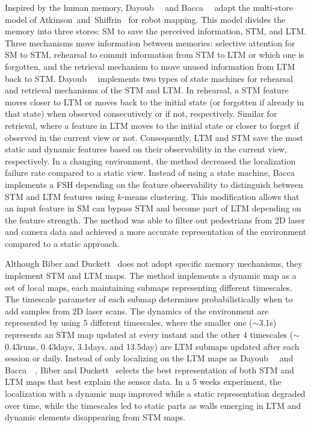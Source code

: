 Inspired by the human memory, Dayoub~\etal~\cite{dayoub-et-al:2011:013} and Bacca~\etal~\cite{bacca-et-al:2013:003} adapt the multi-store model of Atkinson~and~Shiffrin~\cite{discussion:atkinson:stm+ltm} for robot mapping. This model divides the memory into three stores: \gls{SM} to save the perceived information, \gls{STM}, and \gls{LTM}.
Three mechanisms move information between memories: selective attention for \gls{SM} to \gls{STM}, rehearsal to commit information from \gls{STM} to \gls{LTM} or which one is forgotten, and the retrieval mechanism to move unused information from \gls{LTM} back to \gls{STM}.
Dayoub~\etal~\cite{dayoub-et-al:2011:013} implements two types of state machines for rehearsal and retrieval mechanisms of the \gls{STM} and \gls{LTM}. In rehearsal, a \gls{STM} feature moves closer to \gls{LTM} or moves back to the initial state (or forgotten if already in that state) when observed consecutively or if not, respectively. Similar for retrieval, where a feature in \gls{LTM} moves to the initial state or closer to forget if observed in the current view or not.
Consequently, \gls{LTM} and \gls{STM} save the most static and dynamic features based on their observability in the current view, respectively.
In a changing environment, the method decreased the localization failure rate compared to a static view.
Instead of using a state machine, Bacca~\etal~\cite{bacca-et-al:2013:003} implements a \gls{FSH} depending on the feature observability to distinguish between \gls{STM} and \gls{LTM} features using $k$-means clustering. This modification allows that an input feature in \gls{SM} can bypass \gls{STM} and become part of \gls{LTM} depending on the feature strength.
The method was able to filter out pedestrians from 2D laser and camera data and achieved a more accurate representation of the environment compared to a static approach.

Although Biber and Duckett~\cite{biber-duckett:2009:0278364908096286} does not adopt specific memory mechanisms, they implement \gls{STM} and \gls{LTM} maps. The method implements a dynamic map as a set of local maps, each maintaining submaps representing different timescales. The timescale parameter of each submap determines probabilistically when to add samples from 2D laser scans.
The dynamics of the environment are represented by using 5 different timescales, where the smaller one ($\sim$3.1s) represents an \gls{STM} map updated at every instant and the other 4 timescales ($\sim$0.43runs, 0.43days, 3.1days, and 13.5day) are \gls{LTM} submaps updated after each session or daily. Instead of only localizing on the \gls{LTM} maps as Dayoub~\etal~\cite{dayoub-et-al:2011:013} and Bacca~\etal~\cite{bacca-et-al:2013:003}, Biber and Duckett~\cite{biber-duckett:2009:0278364908096286} selects the best representation of both \gls{STM} and \gls{LTM} maps that best explain the sensor data.
In a 5 weeks experiment, the localization with a dynamic map improved while a static representation degraded over time, while the timescales led to static parts as walls emerging in \gls{LTM} and dynamic elements disappearing from \gls{STM} maps.

